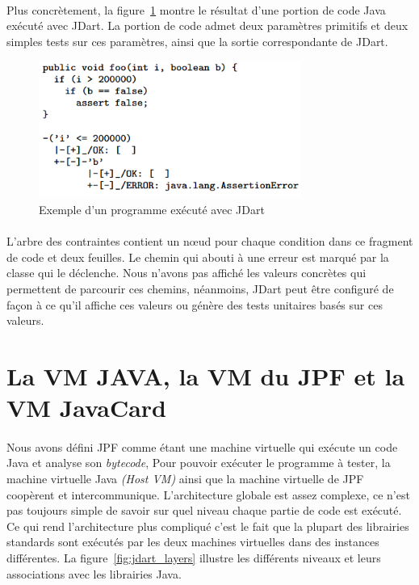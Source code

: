 			\paragraph{}
				Plus concrètement, la figure~\ref{fig:jdart_sample} montre le résultat d'une portion de code Java exécuté avec JDart.
				La portion de code admet deux paramètres primitifs et deux simples tests sur ces paramètres, ainsi que la sortie correspondante
				de JDart.
				
			\begin{figure}[H]
				\centering
					\includegraphics[scale=0.5]{images/jdart_exemple.png}
				\caption{Exemple d'un programme exécuté 
avec JDart}
				\label{fig:jdart_sample} 
			\end{figure}
			
			\paragraph{}
				L'arbre des contraintes contient un n\oe{}ud pour chaque condition dans ce fragment de code et deux feuilles.
				Le chemin qui abouti à une erreur est marqué par la classe qui le déclenche.
				Nous n'avons pas affiché les valeurs concrètes qui permettent de parcourir ces chemins, néanmoins, JDart peut être configuré
				de façon à ce qu'il affiche ces valeurs ou génère des tests unitaires basés sur ces valeurs.
      
	\section{La VM JAVA, la VM du JPF et la VM JavaCard}
		\paragraph{}
			Nous avons défini \gls{JPF} comme étant une machine virtuelle qui exécute un code Java et analyse son \textit{\gls{bytecode}},
			Pour pouvoir exécuter le programme à tester, la machine virtuelle Java \textit{(Host VM)} ainsi que la machine virtuelle de \gls{JPF}
			coopèrent et intercommunique.
			L'architecture globale est assez complexe, ce n'est pas toujours simple de savoir sur quel niveau chaque partie de code est exécuté.
			Ce qui rend l'architecture plus compliqué c'est le fait que la plupart des librairies standards sont exécutés par les deux machines
			virtuelles dans des instances différentes.
			La figure~\ref{fig:jdart_layers} illustre les différents niveaux et leurs associations avec les librairies Java.
			
